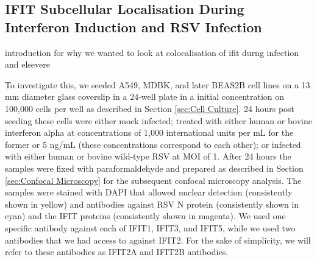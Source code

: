 \subsection{IFIT Subcellular Localisation During Interferon Induction and RSV Infection} \label{subsec:IFIT Subcellular Localisation During Interferon Induction and RSV Infection}
introduction for why we wanted to look at colocalisation of ifit durng infection and elsevere

To investigate this, we seeded A549, MDBK, and later BEAS2B cell lines on a 13 mm diameter glass coverslip in a 24-well plate in a initial concentration on 100,000 cells per well as described in Section \ref{sec:Cell Culture}. 24 hours post seeding these cells were either mock infected; treated with either human or bovine interferon alpha at concentrations of 1,000 international units per mL for the former or 5 ng/mL (these concentrations correspond to each other); or infected with either human or bovine wild-type RSV at MOI of 1. After 24 hours the samples were fixed with paraformaldehyde and prepared as described in Section \ref{sec:Confocal Microscopy} for the subsequent confocal microscopy analysis. The samples were stained with DAPI that allowed nuclear detection (consistently shown in yellow) and antibodies against RSV N protein (consistently shown in cyan) and the IFIT proteins (consistently shown in magenta). We used one specific antibody against each of IFIT1, IFIT3, and IFIT5, while we used two antibodies that we had access to against IFIT2. For the sake of simplicity, we will refer to these antibodies as IFIT2A and IFIT2B antibodies.

